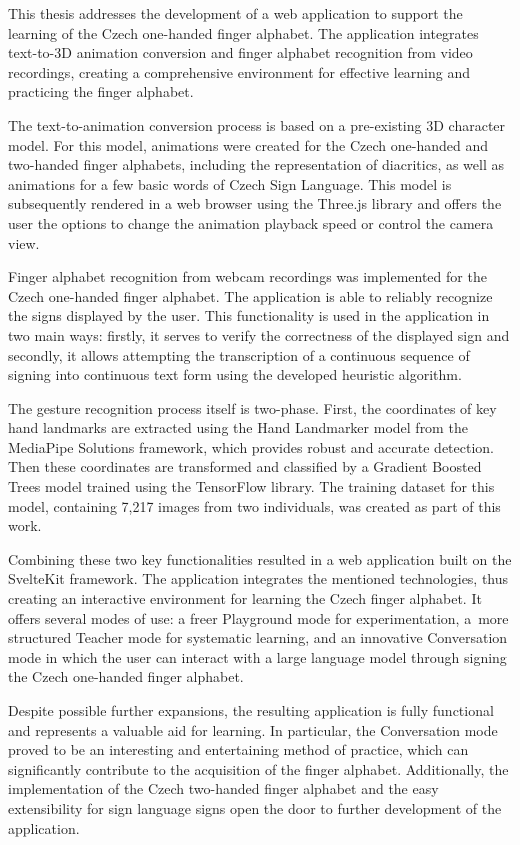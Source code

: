 \documentclass[
  master,
  program=ainfvs,
  biblatex,
  figures=true,
  tables=false,
  sourcecodes=true,
  glossaries,
  index
]{kidiplom}
\begin{document}
\begin{kiconclusions}[english]
    This thesis addresses the development of a web application to support the learning of the Czech one-handed finger alphabet. The application integrates text-to-3D animation conversion and finger alphabet recognition from video recordings, creating a comprehensive environment for effective learning and practicing the finger alphabet.

    The text-to-animation conversion process is based on a pre-existing 3D character model. For this model, animations were created for the Czech one-handed and two-handed finger alphabets, including the representation of diacritics, as well as animations for a few basic words of Czech Sign Language. This model is subsequently rendered in a web browser using the Three.js library and offers the user the options to change the animation playback speed or control the camera view.
    
    Finger alphabet recognition from webcam recordings was implemented for the Czech one-handed finger alphabet. The application is able to reliably recognize the signs displayed by the user. This functionality is used in the application in two main ways: firstly, it serves to verify the correctness of the displayed sign and secondly, it allows attempting the transcription of a continuous sequence of signing into continuous text form using the developed heuristic algorithm.
    
    The gesture recognition process itself is two-phase. First, the coordinates of key hand landmarks are extracted using the Hand Landmarker model from the MediaPipe Solutions framework, which provides robust and accurate detection. Then these coordinates are transformed and classified by a Gradient Boosted Trees model trained using the TensorFlow library. The training dataset for this model, containing 7,217 images from two individuals, was created as part of this work.
    
    Combining these two key functionalities resulted in a web application built on the SvelteKit framework. The application integrates the mentioned technologies, thus creating an interactive environment for learning the Czech finger alphabet. It offers several modes of use: a freer Playground mode for experimentation, a~more structured Teacher mode for systematic learning, and an innovative Conversation mode in which the user can interact with a large language model through signing the Czech one-handed finger alphabet.
    
    Despite possible further expansions, the resulting application is fully functional and represents a valuable aid for learning. In particular, the Conversation mode proved to be an interesting and entertaining method of practice, which can significantly contribute to the acquisition of the finger alphabet. Additionally, the implementation of the Czech two-handed finger alphabet and the easy extensibility for sign language signs open the door to further development of the application.
\end{kiconclusions}
\end{document}
